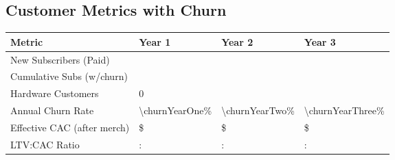 \subsection{Customer Metrics with Churn}
\begin{table}[H]
\centering
\begin{tabularx}{\linewidth}{l Y Y Y}
\toprule
Metric & Year 1 & Year 2 & Year 3 \\\midrule
New Subscribers (Paid) & \numint{\newSubsYearOne} & \numint{\newSubsYearTwo} & \numint{\newSubsYearThree} \\
Cumulative Subs (w/churn) & \numint{\totalSubsYearOne} & \numint{\totalSubsYearTwo} & \numint{\totalSubsYearThree} \\
Hardware Customers & \num{0} & \numint{\hwCustomersYearTwo} & \numint{\hwCustomersYearThree} \\
Annual Churn Rate\cite{recurly2024} & \num{\churnYearOne}\% & \num{\churnYearTwo}\% & \num{\churnYearThree}\% \\
Effective CAC (after merch) & \$\numint{\cacDigital - \merchOffsetSubsCalc} & \$\numint{\cacDigital - \merchOffsetSubsCalc} & \$\numint{\cacDigital - \merchOffsetSubsCalc} \\
LTV:CAC Ratio & \numint{\subLTV/(\cacDigital - \merchOffsetSubsCalc)}: & \numint{\subLTV/(\cacDigital - \merchOffsetSubsCalc)}: & \numint{\subLTV/(\cacDigital - \merchOffsetSubsCalc)}: \\
\bottomrule
\end{tabularx}
\end{table}

